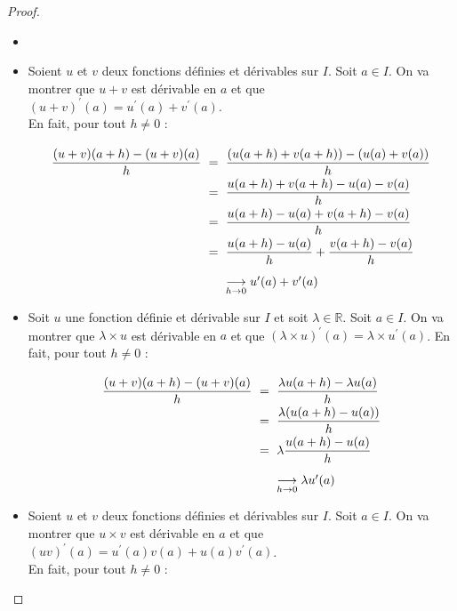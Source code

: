 \documentclass[12pt]{article}
\theoremstyle{break}
\begin{document}
\newpage
\begin{proof}
\begin{itemize}
  \item[]
  \item Soient $u$ et $v$ deux fonctions définies et dérivables sur $I$. Soit $a \in I$. On va montrer que $u+v$ est dérivable en $a$ et que $(u+v)^{\prime}(a)=u^{\prime}(a)+v^{\prime}(a)$.\\
En fait, pour tout $h \neq 0$ :

\begin{equation*}\arraycolsep=3pt\def\arraystretch{2}
  \begin{array}{rcl}
    \dfrac{(u+v)(a+h)-(u+v)(a)}{h} & = & \dfrac{(u(a+h)+v(a+h))-(u(a)+v(a))}{h} \\
    & = &\dfrac{u(a+h)+v(a+h)-u(a)-v(a)}{h} \\
    & = &\dfrac{u(a+h)-u(a)+v(a+h)-v(a)}{h} \\
    & = &\dfrac{u(a+h)-u(a)}{h}+\dfrac{v(a+h)-v(a)}{h} \\
    & &\underset{h \rightarrow 0}{\longrightarrow} u^{\prime}(a)+v^{\prime}(a)
  \end{array}
\end{equation*}

  \item Soit $u$ une fonction définie et dérivable sur $I$ et soit $\lambda \in \mathbb{R}$. Soit $a \in I$. On va montrer que $\lambda \times u$ est dérivable en $a$ et que $(\lambda \times u)^{\prime}(a)=\lambda \times u^{\prime}(a)$. En fait, pour tout $h \neq 0$ :

\begin{equation*}\arraycolsep=3pt\def\arraystretch{2}
  \begin{array}{rcl}
    \dfrac{(u+v)(a+h)-(u+v)(a)}{h} & = & \dfrac{\lambda u(a+h)-\lambda u(a)}{h} \\
    & = & \dfrac{\lambda(u(a+h)-u(a))}{h} \\
    & = & \lambda \dfrac{u(a+h)-u(a)}{h} \\
    & & \underset{h \rightarrow 0}{\longrightarrow} \lambda u^{\prime}(a)
  \end{array}
\end{equation*}

  \item Soient $u$ et $v$ deux fonctions définies et dérivables sur $I$. Soit $a \in I$. On va montrer que $u \times v$ est dérivable en $a$ et que $(u v)^{\prime}(a)=u^{\prime}(a) v(a)+u(a) v^{\prime}(a)$.\\
  En fait, pour tout $h \neq 0$ :


\end{itemize}
\end{proof}
\end{document}
